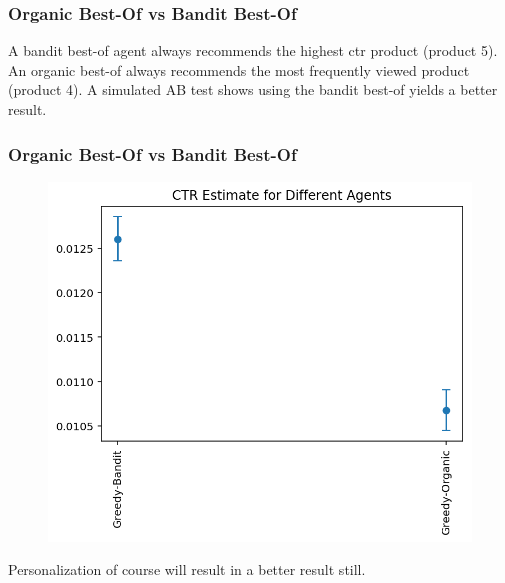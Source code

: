 \begin{frame}
\frametitle{Organic Best-Of vs Bandit Best-Of}

A bandit best-of agent always recommends the highest ctr product (product 5).  An organic best-of always recommends the most frequently viewed product (product 4).  A simulated AB test shows using the bandit best-of yields a better result.

\end{frame}

\begin{frame}
\frametitle{Organic Best-Of vs Bandit Best-Of}
  
\begin{figure}[h!]
\includegraphics[scale=0.4]{images/bestof.png}
\centering
\label{motex1}
\end{figure}

\pause
Personalization of course will result in a better result still.
\end{frame}



